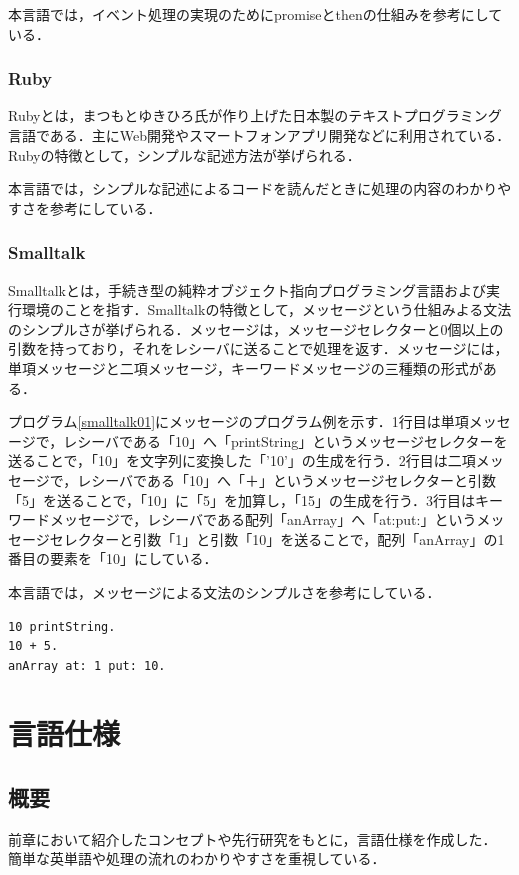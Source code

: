 \documentclass[10pt,a4j]{ltjsarticle}
\begin{document}
本言語では，イベント処理の実現のためにpromiseとthenの仕組みを参考にしている．

\subsubsection{Ruby}
Rubyとは，まつもとゆきひろ氏が作り上げた日本製のテキストプログラミング言語である．主にWeb開発やスマートフォンアプリ開発などに利用されている．Rubyの特徴として，シンプルな記述方法が挙げられる．

本言語では，シンプルな記述によるコードを読んだときに処理の内容のわかりやすさを参考にしている．
\subsubsection{Smalltalk}
Smalltalkとは，手続き型の純粋オブジェクト指向プログラミング言語および実行環境のことを指す．Smalltalkの特徴として，メッセージという仕組みよる文法のシンプルさが挙げられる．メッセージは，メッセージセレクターと0個以上の引数を持っており，それをレシーバに送ることで処理を返す．メッセージには，単項メッセージと二項メッセージ，キーワードメッセージの三種類の形式がある．

プログラム\ref{smalltalk01}にメッセージのプログラム例を示す．1行目は単項メッセージで，レシーバである「10」へ「printString」というメッセージセレクターを送ることで，「10」を文字列に変換した「'10'」の生成を行う．2行目は二項メッセージで，レシーバである「10」へ「＋」というメッセージセレクターと引数「5」を送ることで，「10」に「5」を加算し，「15」の生成を行う．3行目はキーワードメッセージで，レシーバである配列「anArray」へ「at:put:」というメッセージセレクターと引数「1」と引数「10」を送ることで，配列「anArray」の1番目の要素を「10」にしている．

本言語では，メッセージによる文法のシンプルさを参考にしている．

\clearpage

\begin{lstlisting}[caption=メッセージのプログラム例, label=smalltalk01]
10 printString.
10 + 5.
anArray at: 1 put: 10.
\end{lstlisting}
\clearpage

\section{言語仕様}
\subsection{概要}
前章において紹介したコンセプトや先行研究\cite{senkou1,senkou2}をもとに，言語仕様を作成した．
簡単な英単語や処理の流れのわかりやすさを重視している．
\end{document}
